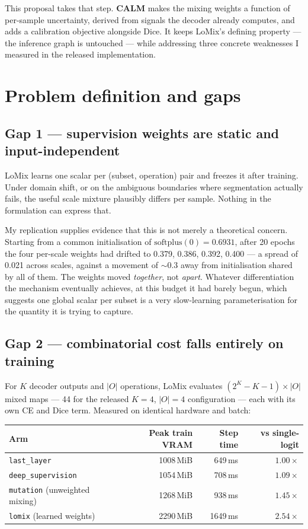 \documentclass[11pt,a4paper]{article}
\newcommand{\code}[1]{\texttt{\small #1}}
\begin{document}
This proposal takes that step. \textbf{CALM} makes the mixing weights a function
of per-sample uncertainty, derived from signals the decoder already computes,
and adds a calibration objective alongside Dice. It keeps LoMix's defining
property --- the inference graph is untouched --- while addressing three
concrete weaknesses I measured in the released implementation.

\section{Problem definition and gaps}

\subsection{Gap 1 --- supervision weights are static and input-independent}

LoMix learns one scalar per (subset, operation) pair and freezes it after
training. Under domain shift, or on the ambiguous boundaries where segmentation
actually fails, the useful scale mixture plausibly differs per sample. Nothing
in the formulation can express that.

My replication supplies evidence that this is not merely a theoretical concern.
Starting from a common initialisation of $\mathrm{softplus}(0) = 0.6931$, after
20 epochs the four per-scale weights had drifted to 0.379, 0.386, 0.392, 0.400
--- a spread of 0.021 across scales, against a movement of ${\sim}0.3$ away from
initialisation shared by all of them. The weights moved \emph{together}, not
\emph{apart}. Whatever differentiation the mechanism eventually achieves, at
this budget it had barely begun, which suggests one global scalar per subset is
a very slow-learning parameterisation for the quantity it is trying to capture.

\subsection{Gap 2 --- combinatorial cost falls entirely on training}

For $K$ decoder outputs and $|O|$ operations, LoMix evaluates
$(2^K - K - 1)\times|O|$ mixed maps --- 44 for the released $K=4$, $|O|=4$
configuration --- each with its own CE and Dice term. Measured on identical
hardware and batch:

\begin{center}
\begin{tabular}{@{}lrrr@{}}
\toprule
\textbf{Arm} & \textbf{Peak train VRAM} & \textbf{Step time} &
\textbf{vs single-logit} \\
\midrule
\code{last\_layer} & 1008\,MiB & 649\,ms & $1.00\times$ \\
\code{deep\_supervision} & 1054\,MiB & 708\,ms & $1.09\times$ \\
\code{mutation} (unweighted mixing) & 1268\,MiB & 938\,ms & $1.45\times$ \\
\code{lomix} (learned weights) & 2290\,MiB & 1649\,ms & $\mathbf{2.54\times}$ \\
\bottomrule
\end{tabular}
\end{center}
\end{document}
